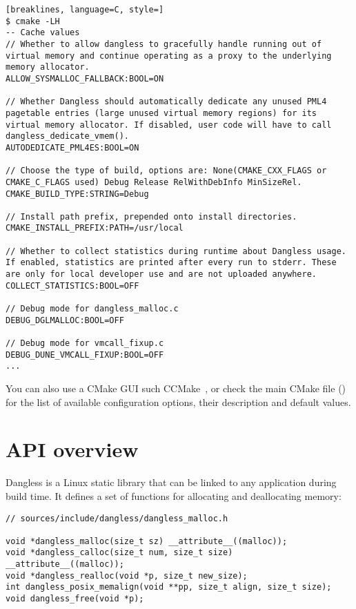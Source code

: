 \begin{lstlisting}[breaklines, language=C, style=]
$ cmake -LH
-- Cache values
// Whether to allow dangless to gracefully handle running out of virtual memory and continue operating as a proxy to the underlying memory allocator.
ALLOW_SYSMALLOC_FALLBACK:BOOL=ON

// Whether Dangless should automatically dedicate any unused PML4 pagetable entries (large unused virtual memory regions) for its virtual memory allocator. If disabled, user code will have to call dangless_dedicate_vmem().
AUTODEDICATE_PML4ES:BOOL=ON

// Choose the type of build, options are: None(CMAKE_CXX_FLAGS or CMAKE_C_FLAGS used) Debug Release RelWithDebInfo MinSizeRel.
CMAKE_BUILD_TYPE:STRING=Debug

// Install path prefix, prepended onto install directories.
CMAKE_INSTALL_PREFIX:PATH=/usr/local

// Whether to collect statistics during runtime about Dangless usage. If enabled, statistics are printed after every run to stderr. These are only for local developer use and are not uploaded anywhere.
COLLECT_STATISTICS:BOOL=OFF

// Debug mode for dangless_malloc.c
DEBUG_DGLMALLOC:BOOL=OFF

// Debug mode for vmcall_fixup.c
DEBUG_DUNE_VMCALL_FIXUP:BOOL=OFF
...
\end{lstlisting}

You can also use a CMake GUI such CCMake~\cite{ccmake-website}, or check the main CMake file () for the list of available configuration options, their description and default values.

\section{API overview}

Dangless is a Linux static library  that can be linked to any application during build time. It defines a set of functions for allocating and deallocating memory:

\begin{lstlisting}
// sources/include/dangless/dangless_malloc.h

void *dangless_malloc(size_t sz) __attribute__((malloc));
void *dangless_calloc(size_t num, size_t size) __attribute__((malloc));
void *dangless_realloc(void *p, size_t new_size);
int dangless_posix_memalign(void **pp, size_t align, size_t size);
void dangless_free(void *p);
\end{lstlisting}

